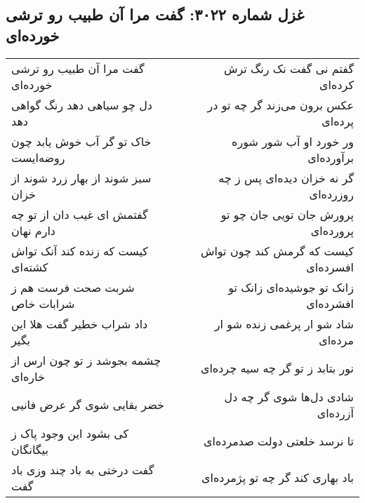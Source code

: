 \begin{center}
\section*{غزل شماره ۳۰۲۲: گفت مرا آن طبیب رو ترشی خورده‌ای}
\label{sec:3022}
\begin{longtable}{l p{0.5cm} r}
گفت مرا آن طبیب رو ترشی خورده‌ای
&&
گفتم نی گفت نک رنگ ترش کرده‌ای
\\
دل چو سیاهی دهد رنگ گواهی دهد
&&
عکس برون می‌زند گر چه تو در پرده‌ای
\\
خاک تو گر آب خوش یابد چون روضه‌ایست
&&
ور خورد او آب شور شوره برآورده‌ای
\\
سبز شوند از بهار زرد شوند از خزان
&&
گر نه خزان دیده‌ای پس ز چه روزرده‌ای
\\
گفتمش ای غیب دان از تو چه دارم نهان
&&
پرورش جان تویی جان چو تو پرورده‌ای
\\
کیست که زنده کند آنک تواش کشته‌ای
&&
کیست که گرمش کند چون تواش افسرده‌ای
\\
شربت صحت فرست هم ز شرابات خاص
&&
زانک تو جوشیده‌ای زانک تو افشرده‌ای
\\
داد شراب خطیر گفت هلا این بگیر
&&
شاد شو ار پرغمی زنده شو ار مرده‌ای
\\
چشمه بجوشد ز تو چون ارس از خاره‌ای
&&
نور بتابد ز تو گر چه سیه چرده‌ای
\\
خضر بقایی شوی گر عرض فانیی
&&
شادی دل‌ها شوی گر چه دل آزرده‌ای
\\
کی بشود این وجود پاک ز بیگانگان
&&
تا نرسد خلعتی دولت صدمرده‌ای
\\
گفت درختی به باد چند وزی باد گفت
&&
باد بهاری کند گر چه تو پژمرده‌ای
\\
\end{longtable}
\end{center}
